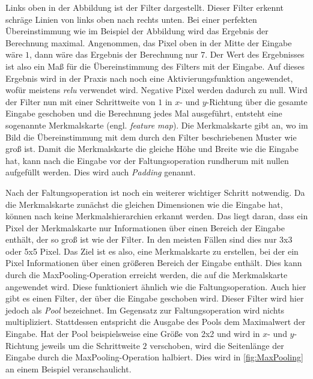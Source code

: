 Links oben in der Abbildung ist der Filter dargestellt.
Dieser Filter erkennt schräge Linien von links oben nach rechts unten.
Bei einer perfekten Übereinstimmung wie im Beispiel der Abbildung wird das Ergebnis der Berechnung maximal.
Angenommen, das Pixel oben in der Mitte der Eingabe wäre $1$, dann wäre das Ergebnis der Berechnung nur $7$.
Der Wert des Ergebnisses ist also ein Maß für die Übereinstimmung des Filters mit der Eingabe.
Auf dieses Ergebnis wird in der Praxis nach \cite{6S191CNN} noch eine Aktivierungsfunktion angewendet, wofür meistens \emph{\acrshort{relu}} verwendet wird.
Negative Pixel werden dadurch zu null.
Wird der Filter nun mit einer Schrittweite von $1$ in $x$- und $y$-Richtung über die gesamte Eingabe geschoben und die Berechnung jedes Mal ausgeführt, entsteht eine sogenannte Merkmalskarte (engl. \emph{feature map}).
Die Merkmalskarte gibt an, wo im Bild die Übereinstimmung mit dem durch den Filter beschriebenen Muster wie groß ist.
Damit die Merkmalskarte die gleiche Höhe und Breite wie die Eingabe hat, kann nach \cite[S. 168 f.]{DeepLearningPythonKeras} die Eingabe vor der Faltungsoperation rundherum mit nullen aufgefüllt werden.
Dies wird auch \emph{Padding} genannt.

Nach der Faltungsoperation ist noch ein weiterer wichtiger Schritt notwendig.
Da die Merkmalskarte zunächst die gleichen Dimensionen wie die Eingabe hat, können nach \cite[S. 171]{DeepLearningPythonKeras} keine Merkmalshierarchien erkannt werden.
Das liegt daran, dass ein Pixel der Merkmalskarte nur Informationen über einen Bereich der Eingabe enthält, der so groß ist wie der Filter.
In den meisten Fällen sind dies nur 3x3 oder 5x5 Pixel.
Das Ziel ist es also, eine Merkmalskarte zu erstellen, bei der ein Pixel Informationen über einen größeren Bereich der Eingabe enthält.
Dies kann durch die MaxPooling-Operation erreicht werden, die auf die Merkmalskarte angewendet wird.
Diese funktioniert ähnlich wie die Faltungsoperation.
Auch hier gibt es einen Filter, der über die Eingabe geschoben wird.
Dieser Filter wird hier jedoch als \emph{Pool} bezeichnet.
Im Gegensatz zur Faltungsoperation wird nichts multipliziert.
Stattdessen entspricht die Ausgabe des Pools dem Maximalwert der Eingabe.
Hat der Pool beispielsweise eine Größe von 2x2 und wird in $x$- und $y$-Richtung jeweils um die Schrittweite $2$ verschoben, wird die Seitenlänge der Eingabe durch die MaxPooling-Operation halbiert.
Dies wird in \autoref{fig:MaxPooling} an einem Beispiel veranschaulicht.

